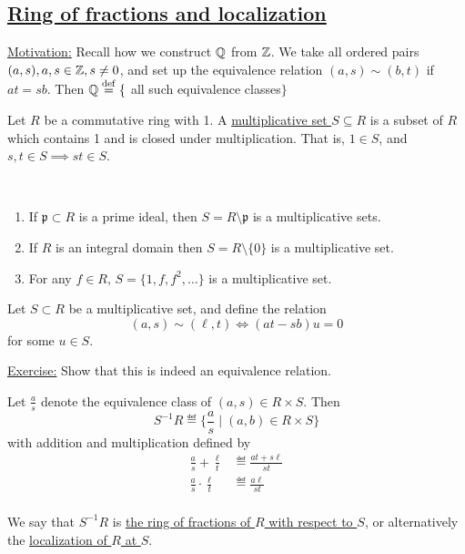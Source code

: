 \documentclass[x11names,reqno,14pt]{extarticle}
\newcommand{\mk}[1]{\mathfrak{#1}}
\begin{document}
\subsection*{\underline{Ring of fractions and localization}}

\underline{Motivation:} Recall how we construct $\mathbb{Q}$ from $\mathbb{Z}$. We take all ordered pairs $(a, s), a, s \in \mathbb{Z}, s \neq 0$, and set up the equivalence relation $(a, s) \sim (b, t)$ if $at = sb$. Then $\mathbb{Q} \overset{\mathrm{def}}{=} \{$ all such equivalence classes$\}$


Let $R$ be a commutative ring with 1. A \underline{multiplicative set $S \subseteq R$} is a subset of $R$ which contains 1 and is closed under multiplication. That is, $1 \in S$, and $s, t \in S \implies st \in S$. 

\exm
\,

\begin{enumerate}

\item If $\mk{p} \subset R$ is a prime ideal, then $S = R\setminus\mk{p}$ is a multiplicative sets. 

\item If $R$ is an integral domain then $S = R\setminus\{0\}$ is a multiplicative set. 

\item For any $f \in R$, $S = \{1, f, f^2, \dots\}$ is a multiplicative set. 

\end{enumerate}

Let $S \subset R$ be a multiplicative set, and define the relation
\[
(a, s) \sim (\ell, t) \iff (at - sb)u = 0
\]
for some $u \in S$. 

\underline{Exercise:} Show that this is indeed an equivalence relation. 


Let $\frac{a}{s}$ denote the equivalence class of $(a, s) \in R\times S$. Then
\[
S^{-1}R\eqdef\{\frac{a}{s}\mid(a, b)\in R\times S \}
\]
with addition and multiplication defined by 
\begin{align*}
\frac{a}{s} + \frac{\ell}{t} & \eqdef \frac{at + s\ell}{st} \\
\frac{a}{s}\cdot\frac{\ell}{t} & \eqdef \frac{a\ell}{st} \\
\end{align*}

We say that $S^{-1}R$ is \underline{the ring of fractions of $R$ with respect to $S$}, or alternatively the \underline{localization of $R$ at $S$}.
\end{document}
